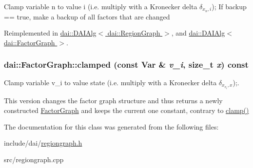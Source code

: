 Clamp variable n to value i (i.e. multiply with a Kronecker delta $\delta_{x_n, i}$); If backup == true, make a backup of all factors that are changed 

Reimplemented in \hyperlink{classdai_1_1DAIAlg_b7d537f1a9d116617d8dce722ce65dc0}{dai::DAIAlg$<$ dai::RegionGraph $>$}, and \hyperlink{classdai_1_1DAIAlg_b7d537f1a9d116617d8dce722ce65dc0}{dai::DAIAlg$<$ dai::FactorGraph $>$}.\hypertarget{classdai_1_1FactorGraph_915d21c0da8c2c1f342371bef6adb0f5}{
\subsubsection[clamped]{ dai::FactorGraph::clamped (const {\bf Var} \& {\em v\_\-i}, \/  size\_\-t {\em x}) const}}
\label{classdai_1_1FactorGraph_915d21c0da8c2c1f342371bef6adb0f5}


Clamp variable v\_\-i to value state (i.e. multiply with a Kronecker delta $\delta_{x_{v_i},x}$);. 

This version changes the factor graph structure and thus returns a newly constructed \hyperlink{classdai_1_1FactorGraph}{FactorGraph} and keeps the current one constant, contrary to \hyperlink{classdai_1_1FactorGraph_3cb7d91ca96090372bd0aacbf70a8948}{clamp()} 

The documentation for this class was generated from the following files:\begin{CompactItemize}
\item 
include/dai/\hyperlink{regiongraph_8h}{regiongraph.h}\item 
src/regiongraph.cpp\end{CompactItemize}

